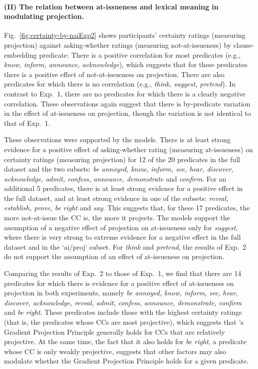 \documentclass[11pt,fleqn]{article}
\newcommand{\6}{\mbox{$[\hspace*{-.6mm}[$}}
\newcommand{\9}{\mbox{$]\hspace*{-.6mm}]$}}
\newcommand{\citepos}[1]{\citeauthor{#1}'s \citeyear{#1}}
\begin{document}
\paragraph{(II) The relation between at-issueness and lexical meaning in modulating projection.}  Fig.~\ref{fig:certainty-by-naiExp2} shows participants' certainty ratings (measuring projection) against asking-whether ratings (measuring not-at-issueness) by clause-embedding predicate: There is a positive correlation for most predicates (e.g., {\em know, inform, announce, acknowledge}), which suggests that for these predicates there is a positive effect of not-at-issueness on projection. There are also predicates for which there is no correlation (e.g., {\em think, suggest, pretend}). In contrast to Exp.~1, there are no predicates for which there is a clearly negative correlation. These observations again suggest that there is by-predicate variation in the effect of at-issueness on projection, though the variation is not identical to that of Exp.~1. 

These observations were supported by the models. There is at least strong evidence for a positive effect of asking-whether rating (measuring at-issueness) on certainty ratings (measuring projection) for 12 of the 20 predicates in the full dataset and the two subsets: {\em be annoyed, know, inform, see, hear, discover, acknowledge, admit, confess, announce, demonstrate} and {\em confirm}. For an additional 5 predicates, there is at least strong evidence for a positive effect in the full dataset, and at least strong evidence in one of the subsets:  {\em reveal, establish, prove, be right} and {\em say}. This suggests that, for these 17 predicates, the more not-at-issue the CC is, the more it projects. The models support the assumption of a negative effect of projection on at-issueness only for {\em suggest}, where there is very strong to extreme evidence for a negative effect in the full dataset and in the `ai/proj' subset. For {\em think} and {\em pretend}, the results of Exp.~2 do not support the assumption of an effect of at-issueness on projection.

Comparing the results of Exp.~2 to those of Exp.~1, we find that there are 14 predicates for which there is evidence for a positive effect of at-issueness on projection in both experiments, namely {\em be annoyed, know, inform, see, hear, discover, acknowledge, reveal, admit, confess, announce, demonstrate, confirm} and {\em be right}. These predicates include those with the highest certainty ratings (that is, the predicates whose CCs are most projective), which suggests that \citepos{tbd-variability} Gradient Projection Principle generally holds for CCs that are relatively projective. At the same time, the fact that it also holds for {\em be right}, a predicate whose CC is only weakly projective, suggests that other factors may also modulate whether the Gradient Projection Principle holds for a given predicate. 
\end{document}
